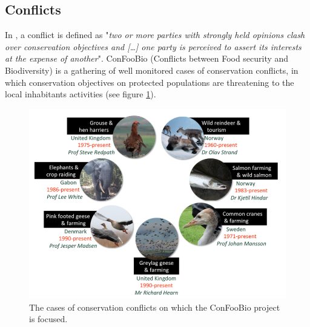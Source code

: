 \documentclass[12pt,a4paper]{article}
\begin{document}

\subsection{Conflicts}

In \cite{redpath2013understanding}, a conflict is defined as "\textit{two or more parties with strongly held opinions clash over conservation objectives and [\dots] one party is perceived to assert its interests at the expense of another}".
ConFooBio (Conflicts between Food security and Biodiversity) is a gathering of well monitored cases of conservation conflicts, in which conservation objectives on protected populations are threatening to the local inhabitants activities (see figure \ref{confoobio}).
\begin{figure}
	\centering
	\includegraphics[scale=0.5]{confoobio-cases.png}
	\caption{The cases of conservation conflicts on which the ConFooBio project is focused.}
	\label{confoobio}
\end{figure}
\end{document}
